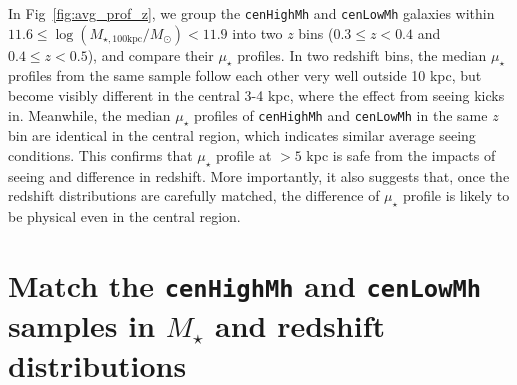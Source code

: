 \documentclass[a4paper,fleqn,usenatbib]{mnras}
\def\rbcg{\texttt{cenHighMh}}
\def\nbcg{\texttt{cenLowMh}}
\def\mstar{{$M_{\star}$}}
\def\logmtot{{$\log (M_{\star,100\mathrm{kpc}}/M_{\odot})$}}
\def\mden{{$\mu_{\star}$}}
\begin{document}
    In Fig~\ref{fig:avg_prof_z}, we group the \rbcg{} and \nbcg{} galaxies within 
    $11.6 \le$\logmtot$< 11.9$ into two $z$ bins ($0.3\leq z<0.4$ and $0.4\leq z<0.5$),
    and compare their \mden{} profiles. 
    In two redshift bins, the median \mden{} profiles from the same sample follow each 
    other very well outside 10 kpc, but become visibly different in the central 3-4 kpc,
    where the effect from seeing kicks in. 
    Meanwhile, the median \mden{} profiles of \rbcg{} and \nbcg{} in the same $z$ bin 
    are identical in the central region, which indicates similar average seeing 
    conditions.       
    This confirms that \mden{} profile at $> 5$ kpc is safe from the impacts of seeing 
    and difference in redshift.
    More importantly, it also suggests that, once the redshift distributions are 
    carefully matched, the difference of \mden{} profile is likely to be physical 
    even in the central region.  

\section{Match the \rbcg{} and \nbcg{} samples in \mstar{} and redshift distributions}
    \label{app:match}
    
\end{document}
